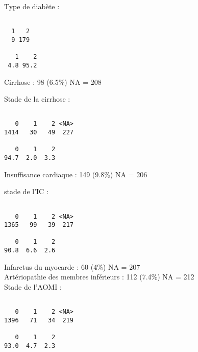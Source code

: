 \documentclass[11pt,a4paper]{article}\usepackage[]{graphicx}\usepackage[]{color}
\makeatletter
\newenvironment{kframe}{%
 \def\at@end@of@kframe{}%
 \ifinner\ifhmode%
  \def\at@end@of@kframe{\end{minipage}}%
  \begin{minipage}{\columnwidth}%
 \fi\fi%
 \def\FrameCommand##1{\hskip\@totalleftmargin \hskip-\fboxsep
 \colorbox{shadecolor}{##1}\hskip-\fboxsep
     \hskip-\linewidth \hskip-\@totalleftmargin \hskip\columnwidth}%
 \MakeFramed {\advance\hsize-\width
   \@totalleftmargin\z@ \linewidth\hsize
   \@setminipage}}%
 {\par\unskip\endMakeFramed%
 \at@end@of@kframe}
\newenvironment{knitrout}{}{} %
\makeatother
\begin{document}
Type de diabète :
\begin{knitrout}
\color{fgcolor}\begin{kframe}
\begin{verbatim}

  1   2 
  9 179 

   1    2 
 4.8 95.2 
\end{verbatim}
\end{kframe}
\end{knitrout}

Cirrhose : 98 (6.5\%) NA = 208

Stade de la cirrhose :

\begin{knitrout}
\color{fgcolor}\begin{kframe}
\begin{verbatim}

   0    1    2 <NA> 
1414   30   49  227 

   0    1    2 
94.7  2.0  3.3 
\end{verbatim}
\end{kframe}
\end{knitrout}

Insuffisance cardiaque : 149 (9.8\%) NA = 206

stade de l’IC :

\begin{knitrout}
\color{fgcolor}\begin{kframe}
\begin{verbatim}

   0    1    2 <NA> 
1365   99   39  217 

   0    1    2 
90.8  6.6  2.6 
\end{verbatim}
\end{kframe}
\end{knitrout}

Infarctus du myocarde : 60 (4\%) NA = 207
~\\

Artériopathie des membres inférieurs : 112 (7.4\%) NA = 212
~\\

Stade de l’AOMI : 

\begin{knitrout}
\color{fgcolor}\begin{kframe}
\begin{verbatim}

   0    1    2 <NA> 
1396   71   34  219 

   0    1    2 
93.0  4.7  2.3 
\end{verbatim}
\end{kframe}
\end{knitrout}
\end{document}
